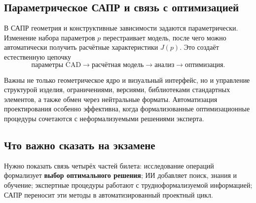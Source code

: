 \subsection{Параметрическое САПР и связь с оптимизацией}

В САПР геометрия и конструктивные зависимости задаются параметрически. Изменение
набора параметров $p$ перестраивает модель, после чего можно автоматически
получить расчётные характеристики $J(p)$. Это создаёт естественную цепочку
\[
\text{параметры CAD}\rightarrow\text{расчётная модель}
\rightarrow\text{анализ}\rightarrow\text{оптимизация}.
\]

Важны не только геометрическое ядро и визуальный интерфейс, но и управление
структурой изделия, ограничениями, версиями, библиотеками стандартных элементов,
а также обмен через нейтральные форматы. Автоматизация проектирования особенно
эффективна, когда формализованные оптимизационные процедуры сочетаются с
неформализуемыми решениями эксперта.


\subsection{Что важно сказать на экзамене}

Нужно показать связь четырёх частей билета: исследование операций формализует \textbf{выбор оптимального решения}; ИИ добавляет поиск, знания и обучение; экспертные процедуры работают с трудноформализуемой информацией; САПР переносит эти методы в автоматизированный проектный цикл.

\newpage
